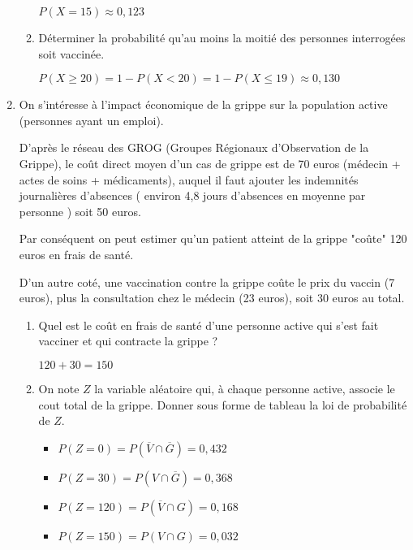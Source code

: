 \documentclass[12pt]{cornouaille}
\begin{document}
\begin{exercice}
\begin{enumerate}
\begin{enumerate}
\begin{solution}
 $P(X=15) \approx 0,123$
\end{solution}
		\item Déterminer la probabilité qu'au moins la moitié des personnes interrogées soit vaccinée.

\begin{solution}
$P(X \geqslant 20) = 1- P(X < 20) =  1- P(X \leqslant 19) \approx 0,130$
\end{solution}
 	\end{enumerate}
\item On s'intéresse à l'impact économique de la grippe sur la population active (personnes ayant un emploi).

D'après le réseau des GROG (Groupes Régionaux d'Observation de la Grippe),
le coût direct moyen d'un cas de grippe est de 70 euros (médecin + actes de soins + médicaments),
 auquel il faut ajouter les indemnités journalières d'absences (
	environ 4,8 jours d'absences en moyenne par personne
) soit 50 euros.

Par conséquent on peut estimer qu'un patient atteint de la grippe "coûte" 120 euros en frais de santé.

D'un autre coté, une vaccination contre la grippe coûte le prix du vaccin (7 euros),
 plus la consultation chez le médecin (23 euros),  soit 30 euros au total.

  \begin{enumerate}
  \item Quel est le coût en frais de santé d'une personne active qui s'est fait vacciner et qui contracte la grippe ?

\begin{solution}
$120+30=150$
\end{solution}
  \item On note $Z$ la variable aléatoire qui, à chaque personne active, associe le cout total de la grippe. 
  Donner sous forme de tableau la loi de probabilité de $Z$.

\begin{solution}
\begin{itemize}
	\item $P(Z=0) = P(\overline{V} \cap \overline{G})= 0,432$
	\item $P(Z=30)= P(V \cap \overline{G})=0,368$
	\item $P(Z=120)= P(\overline{V} \cap G)=0,168$
	\item $P(Z=150)= P(V \cap G)=0,032$
\end{itemize}


\end{solution}
\end{enumerate}
\end{enumerate}
\end{exercice}
\end{document}
